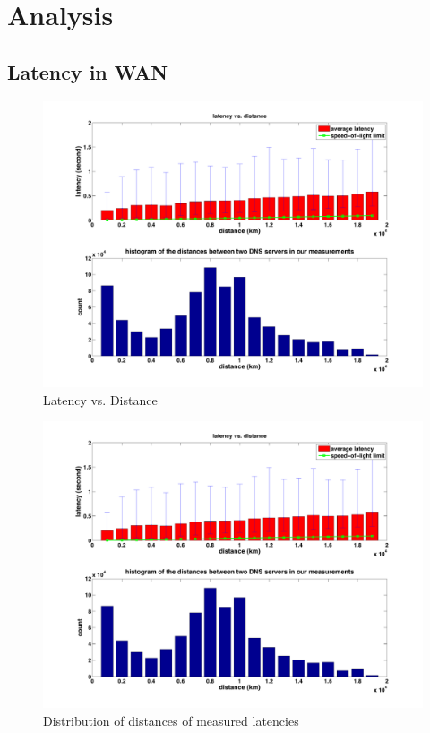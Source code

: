 \section{Analysis}
\label{sec:analysis}

\subsection{Latency in WAN}
\label{sec:latency-wan-1}

\begin{figure}
  \centering
  \includegraphics[width=\linewidth]{../figs/King_latency_dist.pdf}
  \caption{Latency vs. Distance}
  \label{fig:latency_dist}
\end{figure}

\begin{figure}
  \centering
  \includegraphics[width=\linewidth]{../figs/King_distance_distrbution.pdf}
  \caption{Distribution of distances of measured latencies}
  \label{fig:latency_distance_distribution}
\end{figure}

